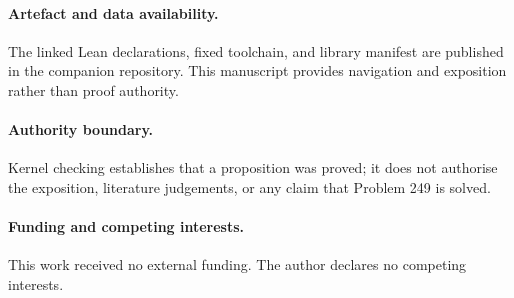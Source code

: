 \documentclass[11pt]{article}
\theoremstyle{breakplain}
\theoremstyle{breakdefinition}
\theoremstyle{breakdefinition}
\begin{document}
\paragraph{Artefact and data availability.} The linked Lean declarations,
fixed toolchain, and library manifest are published in the companion
repository. This manuscript provides navigation and exposition rather than
proof authority.

\paragraph{Authority boundary.} Kernel checking establishes that a proposition
was proved; it does not authorise the exposition, literature judgements, or any
claim that Problem 249 is solved.

\paragraph{Funding and competing interests.} This work received no external
funding. The author declares no competing interests.
\end{document}
